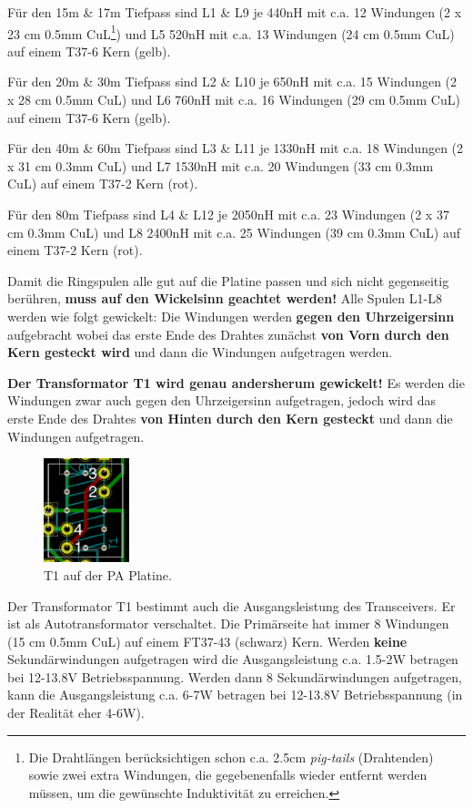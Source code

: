 \documentclass[10pt, a4paper]{paper}
\newcommand{\warn}[1]{\textbf{#1}}
\begin{document}
Für den 15m \& 17m Tiefpass sind L1 \& L9 je 440nH mit c.a. 12 Windungen (2 x 23 cm 0.5mm CuL\footnote{Die Drahtlängen berücksichtigen schon c.a. 2.5cm \emph{pig-tails} (Drahtenden) sowie zwei extra Windungen, die gegebenenfalls wieder entfernt werden müssen, um die gewünschte Induktivität zu erreichen.}) und L5 520nH mit c.a. 13 Windungen (24 cm 0.5mm CuL) auf einem T37-6 Kern (gelb). 

Für den 20m \& 30m Tiefpass sind L2 \& L10 je 650nH mit c.a. 15 Windungen (2 x 28 cm 0.5mm CuL) und L6 760nH mit c.a. 16 Windungen (29 cm 0.5mm CuL) auf einem T37-6 Kern (gelb).

Für den 40m \& 60m Tiefpass sind L3 \& L11 je 1330nH mit c.a. 18 Windungen (2 x 31 cm 0.3mm CuL) und L7 1530nH mit c.a. 20 Windungen (33 cm 0.3mm CuL) auf einem T37-2 Kern (rot).

Für den 80m Tiefpass sind L4 \& L12 je 2050nH mit c.a. 23 Windungen (2 x 37 cm 0.3mm CuL) und L8 2400nH mit c.a. 25 Windungen (39 cm 0.3mm CuL) auf einem T37-2 Kern (rot).

Damit die Ringspulen alle gut auf die Platine passen und sich nicht gegenseitig berühren, \warn{muss auf den Wickelsinn geachtet werden!} Alle Spulen L1-L8 werden wie folgt gewickelt: Die Windungen werden \textbf{gegen den Uhrzeigersinn} aufgebracht wobei das erste Ende des Drahtes zunächst \textbf{von Vorn durch den Kern gesteckt wird} und dann die Windungen aufgetragen werden. 

\warn{Der Transformator T1 wird genau andersherum gewickelt!} Es werden die Windungen zwar auch gegen den Uhrzeigersinn aufgetragen, jedoch wird das erste Ende des Drahtes \textbf{von Hinten durch den Kern gesteckt} und dann die Windungen aufgetragen. 

\begin{figure}
 \centering
 \includegraphics[width=2.5cm]{fig/T1.png}
 \caption{T1 auf der PA Platine.} \label{fig:T1}
\end{figure}
Der Transformator T1 bestimmt auch die Ausgangsleistung des Transceivers. Er ist als Autotransformator verschaltet. Die Primärseite hat immer 8 Windungen (15 cm 0.5mm CuL) auf einem FT37-43 (schwarz) Kern. Werden \textbf{keine} Sekundärwindungen aufgetragen wird die Ausgangsleistung c.a. 1.5-2W betragen bei 12-13.8V Betriebsspannung. Werden dann 8 Sekundärwindungen aufgetragen, kann die Ausgangsleistung c.a. 6-7W betragen bei 12-13.8V Betriebsspannung (in der Realität eher 4-6W). 
\end{document}
